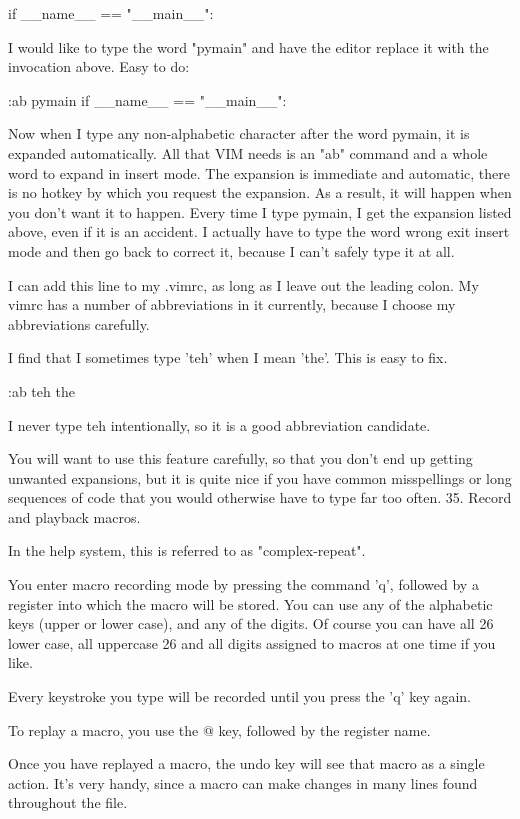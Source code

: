 \documentclass[a4paper, 12pt]{article}
\begin{document}
                  if __name__ == "__main__":
              

      I would like to type the word "pymain" and have the editor replace it with the invocation above. Easy to do:

          :ab pymain if __name__ == "__main__": 

      Now when I type any non-alphabetic character after the word pymain, it is expanded automatically. All that VIM needs is an "ab" command and a whole word to expand in insert mode. The expansion is immediate and automatic, there is no hotkey by which you request the expansion. As a result, it will happen when you don't want it to happen. Every time I type pymain, I get the expansion listed above, even if it is an accident. I actually have to type the word wrong exit insert mode and then go back to correct it, because I can't safely type it at all.

      I can add this line to my .vimrc, as long as I leave out the leading colon. My vimrc has a number of abbreviations in it currently, because I choose my abbreviations carefully.

      I find that I sometimes type 'teh' when I mean 'the'. This is easy to fix.

          :ab teh the 

      I never type teh intentionally, so it is a good abbreviation candidate.

      You will want to use this feature carefully, so that you don't end up getting unwanted expansions, but it is quite nice if you have common misspellings or long sequences of code that you would otherwise have to type far too often.
  35. Record and playback macros.

      In the help system, this is referred to as "complex-repeat".

      You enter macro recording mode by pressing the command 'q', followed by a register into which the macro will be stored. You can use any of the alphabetic keys (upper or lower case), and any of the digits. Of course you can have all 26 lower case, all uppercase 26 and all digits assigned to macros at one time if you like.

      Every keystroke you type will be recorded until you press the 'q' key again.

      To replay a macro, you use the @ key, followed by the register name.

      Once you have replayed a macro, the undo key will see that macro as a single action. It's very handy, since a macro can make changes in many lines found throughout the file.
\end{document}
